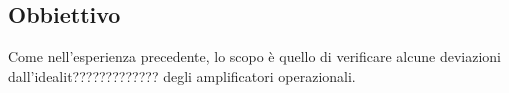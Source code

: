 \subsection{Obbiettivo}

Come nell'esperienza precedente, lo scopo è quello di verificare alcune
deviazioni dall'idealit????????????? degli amplificatori operazionali.
